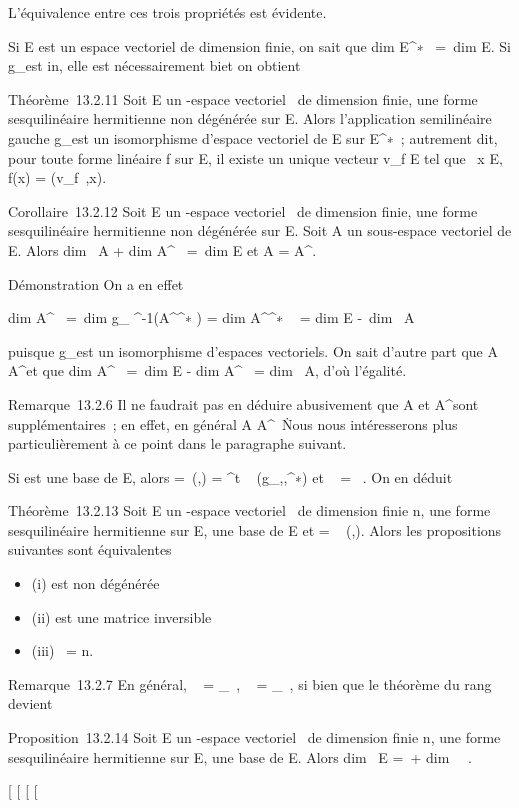 \documentclass[]{article}
\begin{document}
L'équivalence entre ces trois propriétés est évidente.

Si E est un espace vectoriel de dimension finie, on sait que
dim E^∗~ =\
dim E. Si g\_\phi est in\jmathective, elle est nécessairement
bi\jmathective et on obtient

Théorème~13.2.11 Soit E un -espace vectoriel ~de dimension finie, \phi une
forme sesquilinéaire hermitienne non dégénérée sur E. Alors
l'application semilinéaire gauche g\_\phi est un isomorphisme
d'espace vectoriel de E sur E^∗~; autrement dit, pour toute
forme linéaire f sur E, il existe un unique vecteur v\_f \in E tel
que \forall~x \in E, f(x) = \phi(v\_f~,x).

Corollaire~13.2.12 Soit E un -espace vectoriel ~de dimension finie, \phi
une forme sesquilinéaire hermitienne non dégénérée sur E. Soit A un
sous-espace vectoriel de E. Alors dim~ A
+ dim A^\bot~ =\
dim E et A = A^\bot\bot.

Démonstration On a en effet

dim A^\bot~ =\
dim g\_ \phi^-1(A^\bot^∗ )
= dim A^\bot^∗ ~
= dim E -\ dim~ A

puisque g\_\phi est un isomorphisme d'espaces vectoriels. On sait
d'autre part que A \subset~ A^\bot\bot et que
dim A^\bot\bot~ =\
dim E - dim A^\bot~
= dim~ A, d'où l'égalité.

Remarque~13.2.6 Il ne faudrait pas en déduire abusivement que A et
A^\bot sont supplémentaires~; en effet, en général A \bigcap
A^\bot\neq~\0\.
Nous nous intéresserons plus particulièrement à ce point dans le
paragraphe suivant.

Si  est une base de E, alors \Omega =\
\mathrmMat (\phi,) =
^t \mathrmMat~
(g\_\phi,,\mathcal{E}^∗) et
\mathrmrg~\phi
= \mathrmrg~\Omega. On en déduit

Théorème~13.2.13 Soit E un -espace vectoriel ~de dimension finie n, \phi
une forme sesquilinéaire hermitienne sur E,  une base de E et \Omega
= \mathrmMat~ (\phi,). Alors
les propositions suivantes sont équivalentes

\begin{itemize}
\itemsep1pt\parskip0pt\parsep0pt
\item
  (i) \phi est non dégénérée
\item
  (ii) \Omega est une matrice inversible
\item
  (iii) \mathrmrg~\phi = n.
\end{itemize}

Remarque~13.2.7 En général,
\mathrmKer~\phi
= \mathrmKerg\_\phi~,
\mathrmrg~\phi
= \mathrmrgg\_\phi~, si
bien que le théorème du rang devient

Proposition~13.2.14 Soit E un -espace vectoriel ~de dimension finie n,
\phi une forme sesquilinéaire hermitienne sur E,  une base de E. Alors
dim~ E =\
\mathrmrg\phi + dim~
\mathrmKer~\phi.

{[}
{[}
{[}
{[}
\end{document}
